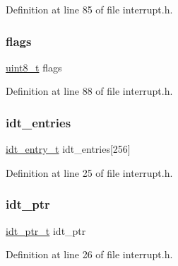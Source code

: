 Definition at line 85 of file interrupt.\+h.

\mbox{\label{a00089_aa2585d779da0ab21273a8d92de9a0ebe_aa2585d779da0ab21273a8d92de9a0ebe}} 
\subsubsection{\texorpdfstring{flags}{flags}}
{\footnotesize\ttfamily \hyperlink{a00116_aba7bc1797add20fe3efdf37ced1182c5_aba7bc1797add20fe3efdf37ced1182c5}{uint8\+\_\+t} flags}



Definition at line 88 of file interrupt.\+h.

\mbox{\label{a00089_a02c62ffc54da283f5faaa40b125d2dce_a02c62ffc54da283f5faaa40b125d2dce}} 
\subsubsection{\texorpdfstring{idt\+\_\+entries}{idt\_entries}}
{\footnotesize\ttfamily \hyperlink{a00089_a1ad45e5b006481ff3604f7b54bd26e13_a1ad45e5b006481ff3604f7b54bd26e13}{idt\+\_\+entry\+\_\+t} idt\+\_\+entries\mbox{[}256\mbox{]}}



Definition at line 25 of file interrupt.\+h.

\mbox{\label{a00089_a3f2660783240a0a506d85e3750dff814_a3f2660783240a0a506d85e3750dff814}} 
\subsubsection{\texorpdfstring{idt\+\_\+ptr}{idt\_ptr}}
{\footnotesize\ttfamily \hyperlink{a00089_a4c173f183e148c7a8a8c1ed9214b909e_a4c173f183e148c7a8a8c1ed9214b909e}{idt\+\_\+ptr\+\_\+t} idt\+\_\+ptr}



Definition at line 26 of file interrupt.\+h.

